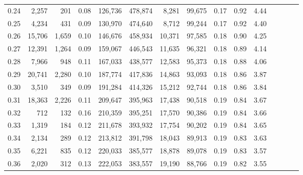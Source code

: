 \begin{tabular}{rrrcrrrrrrrrrrr}
0.24 &   2,257 &     201 &                                       0.08 &  126,736 &  478,874 &    8,281 &   99,675 &  0.17 &  0.92 &                         4.44 \\
0.25 &   4,234 &     431 &                                       0.09 &  130,970 &  474,640 &    8,712 &   99,244 &  0.17 &  0.92 &                         4.40 \\
0.26 &  15,706 &   1,659 &                                       0.10 &  146,676 &  458,934 &   10,371 &   97,585 &  0.18 &  0.90 &                         4.25 \\
0.27 &  12,391 &   1,264 &                                       0.09 &  159,067 &  446,543 &   11,635 &   96,321 &  0.18 &  0.89 &                         4.14 \\
0.28 &   7,966 &     948 &                                       0.11 &  167,033 &  438,577 &   12,583 &   95,373 &  0.18 &  0.88 &                         4.06 \\
0.29 &  20,741 &   2,280 &                                       0.10 &  187,774 &  417,836 &   14,863 &   93,093 &  0.18 &  0.86 &                         3.87 \\
0.30 &   3,510 &     349 &                                       0.09 &  191,284 &  414,326 &   15,212 &   92,744 &  0.18 &  0.86 &                         3.84 \\
0.31 &  18,363 &   2,226 &                                       0.11 &  209,647 &  395,963 &   17,438 &   90,518 &  0.19 &  0.84 &                         3.67 \\
0.32 &     712 &     132 &                                       0.16 &  210,359 &  395,251 &   17,570 &   90,386 &  0.19 &  0.84 &                         3.66 \\
0.33 &   1,319 &     184 &                                       0.12 &  211,678 &  393,932 &   17,754 &   90,202 &  0.19 &  0.84 &                         3.65 \\
0.34 &   2,134 &     289 &                                       0.12 &  213,812 &  391,798 &   18,043 &   89,913 &  0.19 &  0.83 &                         3.63 \\
0.35 &   6,221 &     835 &                                       0.12 &  220,033 &  385,577 &   18,878 &   89,078 &  0.19 &  0.83 &                         3.57 \\
0.36 &   2,020 &     312 &                                       0.13 &  222,053 &  383,557 &   19,190 &   88,766 &  0.19 &  0.82 &                         3.55 \\

\end{tabular}
